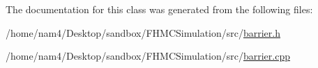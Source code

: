 The documentation for this class was generated from the following files\-:\begin{DoxyCompactItemize}
\item 
/home/nam4/\-Desktop/sandbox/\-F\-H\-M\-C\-Simulation/src/\hyperlink{barrier_8h}{barrier.\-h}\item 
/home/nam4/\-Desktop/sandbox/\-F\-H\-M\-C\-Simulation/src/\hyperlink{barrier_8cpp}{barrier.\-cpp}\end{DoxyCompactItemize}
